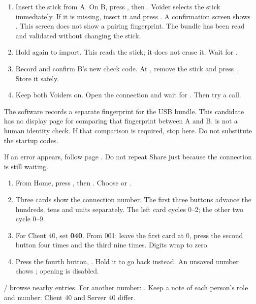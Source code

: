 \begin{enumerate}
\item Insert the stick from A. On B, press , then . Voider selects the stick immediately. If it is missing, insert it and press . A confirmation screen shows . This screen does not show a pairing fingerprint. The bundle has been read and validated without changing the stick.
\item Hold  again to import. This reads the stick; it does not erase it. Wait for .
\item Record and confirm B's new check code. At , remove the stick and press . Store it safely.
\item Keep both Voiders on. Open the connection and wait for . Then try a call.
\end{enumerate}
The software records a separate fingerprint for the USB bundle. This candidate has no display page for comparing that fingerprint between A and B.  is not a human identity check. If that comparison is required, stop here. Do not substitute the startup codes.

If an error appears, follow page \pageref{en:help}. Do not repeat Share just because the connection is still waiting.

\begin{enumerate}
\item From Home, press , then . Choose  or .
\item Three cards show the connection number. The first three buttons advance the hundreds, tens and units separately. The left card cycles 0–2; the other two cycle 0–9.
\item For Client 40, set \textbf{040}. From 001: leave the first card at 0, press the second button four times and the third nine times. Digits wrap to zero.
\item Press the fourth button, . Hold it to go back instead. An unsaved number shows ; opening is disabled.
\end{enumerate}
/ browse nearby entries. For another number:  \arr {}. Keep a note of each person's role and number: Client 40 and Server 40 differ.

